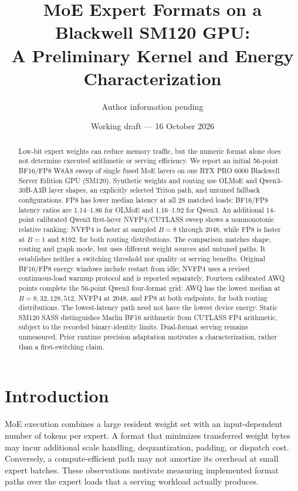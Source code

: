 \documentclass[10pt,twocolumn]{article}
\title{MoE Expert Formats on a Blackwell SM120 GPU:\\A Preliminary Kernel and Energy Characterization}
\author{Author information pending}
\date{Working draft --- 16 October 2026}
\begin{document}
\maketitle

\begin{abstract}
Low-bit expert weights can reduce memory traffic, but the numeric format alone
does not determine executed arithmetic or serving efficiency. We report an
initial 56-point BF16/FP8 W8A8 sweep of single fused MoE layers on one RTX PRO
6000 Blackwell Server Edition GPU (SM120). Synthetic weights and routing use
OLMoE and Qwen3-30B-A3B layer shapes, an explicitly selected Triton path, and
untuned fallback configurations. FP8 has lower median latency at all 28
matched loads: BF16/FP8 latency ratios are 1.14--1.86 for OLMoE and 1.16--1.92
for Qwen3. An additional 14-point calibrated Qwen3 first-layer NVFP4/CUTLASS
sweep shows a nonmonotonic relative ranking: NVFP4 is faster at sampled
$B=8$ through 2048, while FP8 is faster at $B=1$ and 8192, for both routing
distributions. The comparison matches shape, routing and graph mode, but
uses different weight sources and untuned paths. It establishes neither a
switching threshold nor quality or serving benefits. Original BF16/FP8
energy windows include restart from idle; NVFP4 uses a revised continuous-load
warmup protocol and is reported separately. Fourteen calibrated AWQ points
complete the 56-point Qwen3 four-format grid: AWQ has the lowest median at
$B=8,32,128,512$, NVFP4 at 2048, and FP8 at both endpoints, for both
routing distributions. The lowest-latency path need not have the lowest
device energy. Static SM120 SASS distinguishes Marlin BF16 arithmetic from
CUTLASS FP4 arithmetic, subject to the recorded binary-identity limits.
Dual-format serving remains unmeasured. Prior runtime precision
adaptation motivates a characterization, rather than a first-switching claim.
\end{abstract}

\section{Introduction}
MoE execution combines a large resident weight set with an input-dependent
number of tokens per expert. A format that minimizes transferred weight bytes
may incur additional scale handling, dequantization, padding, or dispatch
cost. Conversely, a compute-efficient path may not amortize its overhead at
small expert batches. These observations motivate measuring implemented
format paths over the expert loads that a serving workload actually produces.
\end{document}
